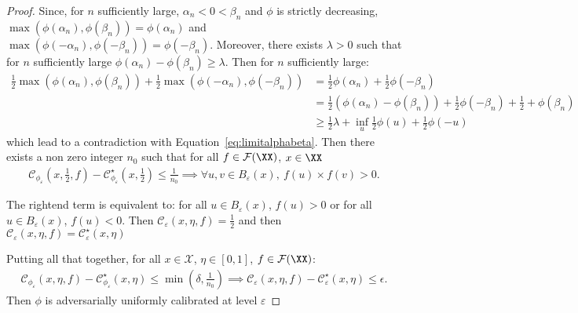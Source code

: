 \begin{proof}
Since, for $n$ sufficiently large, $\alpha_n<0<\beta_n$ and $\phi$ is strictly decreasing, $\max\left(\phi(\alpha_n),\phi(\beta_n)\right) = \phi(\alpha_n)$ and $\max\left(\phi(-\alpha_n),\phi(-\beta_n)\right) = \phi(-\beta_n)$. Moreover, there exists $\lambda>0$ such that for $n$ sufficiently large $\phi(\alpha_n) - \phi(\beta_n)\geq \lambda$. Then for $n$ sufficiently large:
\begin{align*}
    \frac12\max\left(\phi(\alpha_n),\phi(\beta_n)\right)+\frac12\max\left(\phi(-\alpha_n),\phi(-\beta_n)\right) &= \frac{1}{2} \phi(\alpha_n) +\frac12 \phi(-\beta_n)\\
    &= \frac{1}{2} \left(\phi(\alpha_n)- \phi(\beta_n)\right)+\frac12 \phi(-\beta_n)+\frac{1}{2}+ \phi(\beta_n)\\
    &\geq \frac12\lambda +\inf_u \frac12\phi(u)+\frac12\phi(-u)
\end{align*}
which lead to a contradiction with Equation~\ref{eq:limitalphabeta}. Then there exists a non zero integer $n_0$ such that for all $f\in\mathcal{F}(\XX)$, $x\in\XX$
\begin{align*}
    \mathcal{C}_{\phi_\varepsilon}(x,\frac12,f) - \mathcal{C}_{\phi_\varepsilon}^\star(x,\frac12)\leq \frac{1}{n_0} \implies \forall u,v\in B_\varepsilon(x),~ f(u)\times f(v)> 0.
\end{align*}

The rightend term is equivalent to: for all $u\in B_\varepsilon(x)$, $f(u)>0$ or for all $u\in B_\varepsilon(x)$, $f(u)<0$.  Then $\mathcal{C}_\varepsilon(x,\eta,f) =\frac12$ and then $\mathcal{C}_\varepsilon(x,\eta,f) = \mathcal{C}_\varepsilon^\star(x,\eta)$

\medskip

Putting all that together, for all $x\in\mathcal{X}$, $\eta\in [0,1]$, $f\in \mathcal{F}(\XX)$:
\begin{align*}
    \mathcal{C}_{\phi_\varepsilon}(x,\eta,f) - \mathcal{C}_{\phi_\varepsilon}^\star(x,\eta)\leq \min(\delta,\frac{1}{n_0}) \implies \mathcal{C}_{\varepsilon}(x,\eta,f) - \mathcal{C}_{\varepsilon}^\star(x,\eta)\leq \epsilon.
\end{align*}
Then $\phi$ is adversarially uniformly calibrated at level $\varepsilon$
\end{proof}


